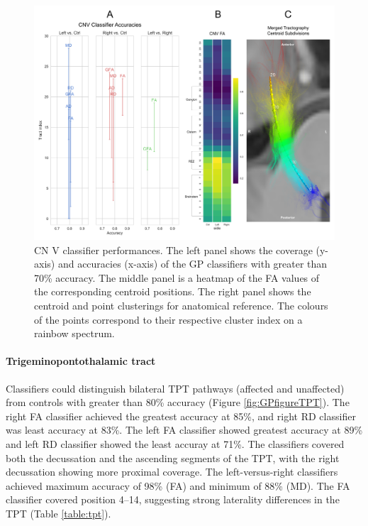 \begin{figure}[ht]
\centering
\includegraphics[width=\linewidth]{figure-GP-CNV.pdf}
\caption{CN V classifier performances. The left panel shows the coverage (y-axis) and accuracies (x-axis) of the GP classifiers with greater than 70\% accuracy. The middle panel is a heatmap of the FA values of the corresponding centroid positions. The right panel shows the centroid and point clusterings for anatomical reference. The colours of the points correspond to their respective cluster index on a rainbow spectrum. }
\label{fig:GPfigure4}
\end{figure}

\paragraph{Trigeminopontothalamic tract}
Classifiers could distinguish bilateral TPT pathways (affected and unaffected) from controls with greater than 80\% accuracy (Figure \ref{fig:GPfigureTPT}). The right FA classifier achieved the greatest accuracy at 85\%, and right RD classifier was least accuracy at 83\%. The left FA classifier showed greatest accuracy at 89\% and left RD classifier showed the least accuray at 71\%. The classifiers covered both the decussation and the ascending segments of the TPT, with the right decussation showing more proximal coverage. The left-versus-right classifiers achieved maximum accuracy of 98\% (FA) and minimum of 88\% (MD). The FA classifier covered position 4--14, suggesting strong laterality differences in the TPT (Table \ref{table:tpt}). 

